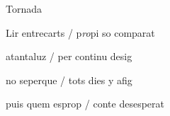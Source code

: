 \documentclass[12pt]{article}
\begin{document}
\begin{estrofaExtra}%




\begin{tornada}

Tornada

\end{tornada}


\end{estrofaExtra}


\begin{estrofa}

 Lir entrecarts / p\textit{ro}pi so comparat

 atantaluz / per continu desig

 no seperque / tots dies y afig

 puis quem esprop / conte desesperat

\end{estrofa}
\end{document}
